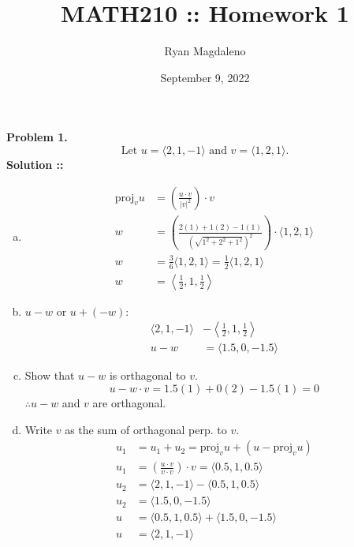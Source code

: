 \documentclass[11pt]{article}
\date{September 9, 2022}
\title{MATH210 :\hspace{2px}: Homework 1}
\author{Ryan Magdaleno}
\begin{document}
\maketitle


\textbf{Problem 1.}
$$\text{Let }u = \langle2,1,-1\rangle\text{ and }v=\langle1,2,1\rangle.$$
\vspace{5px}\textbf{Solution ::}
\begin{enumerate}[a)]
\item 
\begin{align}
    \text{proj}_vu &= \left(\frac{u\cdot v}{|v|^2}\right)\cdot v \\
    w &= \left(\frac{2(1)+1(2)-1(1)}{\left(\sqrt{1^2+2^2+1^2}\right)^2}\right)
    \cdot \langle1,2,1\rangle \\
    w &= \frac{3}{6}\langle1,2,1\rangle = \frac{1}{2}\langle1,2,1\rangle \\
    w &= \left\langle\frac{1}{2},1,\frac{1}{2}\right\rangle
\end{align}
\item
$u-w$ or $u+(-w)$:
\begin{align}
    \langle2,1,-1\rangle &- \left\langle\frac{1}{2},1,\frac{1}{2}\right\rangle \\
    u-w &= \langle1.5,0,-1.5\rangle
\end{align}
\item 
Show that $u-w$ is orthagonal to $v$.
$$u-w\cdot v = 1.5(1)+0(2)-1.5(1) = 0$$
$\therefore u-w$ and $v$ are orthagonal. 
\pagebreak

\item
Write $v$ as the sum of orthagonal perp. to $v$.
\begin{align}
    u_1 &= u_1 + u_2 = \text{proj}_vu + (u-\text{proj}_vu) \\
    u_1 &= \left(\frac{u\cdot v}{v\cdot v}\right)\cdot v = \langle0.5,1,0.5\rangle \\
    u_2 &= \langle2,1,-1\rangle - \langle0.5,1,0.5\rangle \\
    u_2 &= \langle1.5, 0, -1.5\rangle \\
    u &= \langle0.5,1,0.5\rangle + \langle1.5,0,-1.5\rangle \\
    u &= \langle2,1,-1\rangle
\end{align}

\end{enumerate}
\pagebreak
\end{document}
